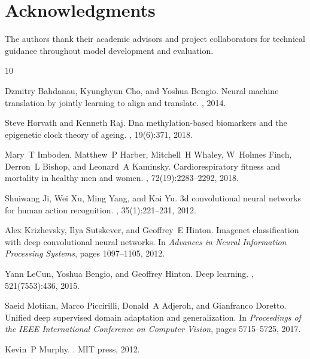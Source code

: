 \documentclass[unnumsec,webpdf,contemporary,large]{oup-authoring-template}%
\theoremstyle{thmstyleone}%
\theoremstyle{thmstyletwo}%
\theoremstyle{thmstylethree}%
\begin{document}
\section{Acknowledgments}
The authors thank their academic advisors and project collaborators for technical guidance throughout model development and evaluation.


\begin{thebibliography}{10}

Dzmitry Bahdanau, Kyunghyun Cho, and Yoshua Bengio.
\newblock Neural machine translation by jointly learning to align and translate.
, 2014.

Steve Horvath and Kenneth Raj.
\newblock Dna methylation-based biomarkers and the epigenetic clock theory of ageing.
, 19(6):371, 2018.

Mary~T Imboden, Matthew~P Harber, Mitchell~H Whaley, W~Holmes Finch, Derron~L Bishop, and Leonard~A Kaminsky.
\newblock Cardiorespiratory fitness and mortality in healthy men and women.
, 72(19):2283--2292, 2018.

Shuiwang Ji, Wei Xu, Ming Yang, and Kai Yu.
\newblock 3d convolutional neural networks for human action recognition.
, 35(1):221--231, 2012.

Alex Krizhevsky, Ilya Sutskever, and Geoffrey~E Hinton.
\newblock Imagenet classification with deep convolutional neural networks.
\newblock In {\em Advances in Neural Information Processing Systems}, pages 1097--1105, 2012.

Yann LeCun, Yoshua Bengio, and Geoffrey Hinton.
\newblock Deep learning.
, 521(7553):436, 2015.

Saeid Motiian, Marco Piccirilli, Donald~A Adjeroh, and Gianfranco Doretto.
\newblock Unified deep supervised domain adaptation and generalization.
\newblock In {\em Proceedings of the IEEE International Conference on Computer Vision}, pages 5715--5725, 2017.

Kevin~P Murphy.
.
\newblock MIT press, 2012.


\end{thebibliography}
\end{document}
